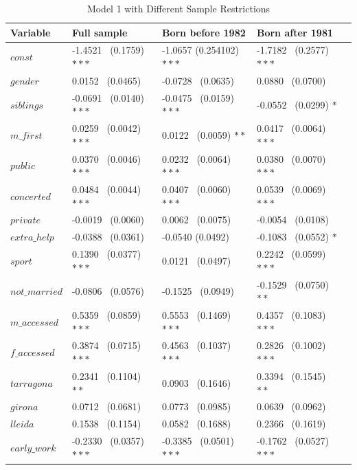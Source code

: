 \documentclass[12pt]{article}
\begin{document}
\newpage
\begin{table} [H]
\caption{Model 1 with Different Sample Restrictions}
\begin{center}
\begin{tabular}{l|l|l|l p{}}
\textbf{Variable}&\textbf{Full sample}&\textbf{Born before 1982}&\textbf{Born after 1981}\\
\hline
$const$&-1.4521 \ (0.1759) $\ast\ast\ast$ &-1.0657 (0.254102) $\ast\ast\ast$ &-1.7182 \ (0.2577) $\ast\ast\ast$\\
\hline
$gender$&0.0152 \ (0.0465) & -0.0728 \ (0.0635) &0.0880 \ (0.0700)\\
\hline
$siblings$&-0.0691 \ (0.0140) $\ast\ast\ast$ & -0.0475 \ (0.0159) $\ast\ast\ast$ &-0.0552 \ (0.0299) $\ast$\\
\hline
$m\_{first}$&0.0259 \ (0.0042) $\ast\ast\ast$ & 0.0122 \ (0.0059) $\ast\ast$ &0.0417 \ (0.0064) $\ast\ast\ast$\\
\hline
$public$&0.0370 \ (0.0046) $\ast\ast\ast$ & 0.0232 \ (0.0064) $\ast\ast\ast$&0.0380 \ (0.0070) $\ast\ast\ast$\\
\hline
$concerted$&0.0484 \ (0.0044) $\ast\ast\ast$ &0.0407 \ (0.0060) $\ast\ast\ast$&0.0539 \ (0.0069) $\ast\ast\ast$\\
\hline
$private$&-0.0019 \ (0.0060) &0.0062 \ (0.0075)&-0.0054 \ (0.0108)\\
\hline
$extra\_{help}$&-0.0388 \ (0.0361)&-0.0540 (0.0492)&-0.1083 \ (0.0552) $\ast$\\
\hline
$sport$&0.1390 \ (0.0377) $\ast\ast\ast$&0.0121 \ (0.0497) &0.2242 \ (0.0599) $\ast\ast\ast$\\
\hline
$not\_{married}$&-0.0806 \ (0.0576)&-0.1525 \ (0.0949)&-0.1529 \ (0.0750) $\ast\ast$\\
\hline
$m\_{accessed}$&0.5359 \ (0.0859) $\ast\ast\ast$&0.5553 \ (0.1469) $\ast\ast\ast$&0.4357 \ (0.1083) $\ast\ast\ast$\\
\hline
$f\_{accessed}$&0.3874 \ (0.0715) $\ast\ast\ast$&0.4563 \ (0.1037) $\ast\ast\ast$&0.2826 \ (0.1002) $\ast\ast\ast$\\
\hline
$tarragona$&0.2341 \ (0.1104) $\ast\ast$&0.0903 \ (0.1646)&0.3394 \ (0.1545) $\ast\ast$\\
\hline
$girona$&0.0712 \ (0.0681)&0.0773 \ (0.0985)&0.0639 \ (0.0962)\\
\hline
$lleida$&0.1538 \ (0.1154)&0.0582 \ (0.1688)&0.2366 \ (0.1619)\\
\hline
$early\_{work}$&-0.2330 \ (0.0357) $\ast\ast\ast$&-0.3385 \ (0.0501) $\ast\ast\ast$&-0.1762 \ (0.0527) $\ast\ast\ast$\\

\end{tabular}
\end{center}
\end{table}
\end{document}
